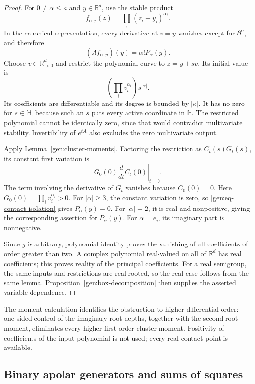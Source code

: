 \documentclass[reqno]{amsart}
\theoremstyle{definition}
\theoremstyle{remark}
\newcommand{\R}{\mathbb R}
\newcommand{\HH}{\mathbb H}
\begin{document}
\begin{proof}
For \(0\neq\alpha\leq\kappa\) and \(y\in\R^d\), use the stable
product
\[
 f_{\alpha,y}(z)=\prod_i(z_i-y_i)^{\alpha_i}.
\]
In the canonical representation, every derivative at \(z=y\)
vanishes except for \(\partial^\alpha\), and therefore
\begin{equation}
 (Af_{\alpha,y})(y)=\alpha!P_\alpha(y).
 \label{gen:eq-contact-isolation}
\end{equation}
Choose \(v\in\R_{>0}^d\) and restrict the polynomial curve to
\(z=y+sv\).  Its initial value is
\[
 \left(\prod_iv_i^{\alpha_i}\right)s^{|\alpha|}.
\]
Its coefficients are differentiable and its degree is bounded by
\(|\kappa|\).  It has no zero for \(s\in\HH\), because such an \(s\)
puts every active coordinate in \(\HH\).
The restricted polynomial cannot be identically zero, since that
would contradict multivariate stability.  Invertibility of
\(e^{tA}\) also excludes the zero multivariate output.

Apply Lemma~\ref{gen:cluster-moments}.  Factoring the restriction
as \(C_t(s)G_t(s)\), its constant first variation is
\[
 G_0(0)\left.\frac{d}{dt}C_t(0)\right|_{t=0}.
\]
The term involving the derivative of \(G_t\) vanishes because \(C_0(0)=0\).
Here \(G_0(0)=\prod_iv_i^{\alpha_i}>0\).
For \(|\alpha|\geq3\), the constant variation is zero, so
\eqref{gen:eq-contact-isolation} gives \(P_\alpha(y)=0\).
For \(|\alpha|=2\), it is real and nonpositive, giving the
corresponding assertion for \(P_\alpha(y)\).
For \(\alpha=e_i\), its imaginary part is nonnegative.

Since \(y\) is arbitrary, polynomial identity proves the vanishing
of all coefficients of order greater than two.  A complex polynomial
real-valued on all of \(\R^d\) has real coefficients; this proves
reality of the principal coefficients.  For a real semigroup,
the same inputs and restrictions are real rooted, so the real
case follows from the same lemma.  Proposition~\ref{gen:box-decomposition}
then supplies the asserted variable dependence.
\end{proof}

The moment calculation identifies the obstruction to higher differential
order: one-sided control of the imaginary root depths, together with
the second root moment, eliminates every higher first-order cluster
moment.  Positivity of coefficients of the input polynomial is not
used; every real contact point is available.

\subsection{Binary apolar generators and sums of squares}
\label{gen:subsec-binary}
\end{document}
